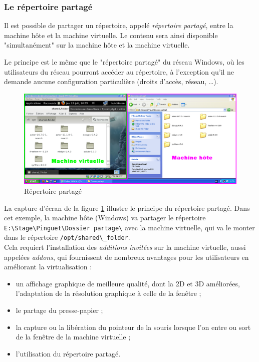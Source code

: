 
\subsubsection{Le répertoire partagé}
\label{Le répertoire partagé}

Il est possible de partager un répertoire, appelé \textit{répertoire partagé}, entre la machine hôte et la machine virtuelle.
Le contenu sera ainsi disponible "simultanément" sur la machine hôte et la machine virtuelle.

Le principe est le même que le "répertoire partagé" du réseau Windows, où les utilisateurs du réseau pourront accéder au répertoire, à l'exception qu'il ne demande aucune configuration particulière (droits d'accès, réseau, \ldots).
\\


\begin{figure}[!h]
	\center
	\includegraphics[scale=0.35]{images/Repertoire_partage.png}
	\caption{Répertoire partagé}
	\label{Screenshot Répertoire partagé}
\end{figure}

La capture d'écran de la figure \ref{Screenshot Répertoire partagé} illustre le principe du répertoire partagé.
Dans cet exemple, la machine hôte (Windows) va partager le répertoire \lstinline{E:\Stage\Pinguet\Dossier partage\} avec la machine virtuelle, qui va le monter dans le répertoire \lstinline{/opt/shared\_folder}.
\\


Cela requiert l'installation des \textit{additions invitées} sur la machine virtuelle, aussi appelées \textit{addons}, qui fournissent de nombreux avantages pour les utilisateurs en améliorant la virtualisation :
\begin{itemize}
	\item un affichage graphique de meilleure qualité, dont la 2D et 3D améliorées, l'adaptation de la résolution graphique à celle de la fenêtre ;
	\item le partage du presse-papier ;
	\item la capture ou la libération du pointeur de la souris lorsque l'on entre ou sort de la fenêtre de la machine virtuelle ;
	\item l'utilisation du répertoire partagé.
\\
\end{itemize}





